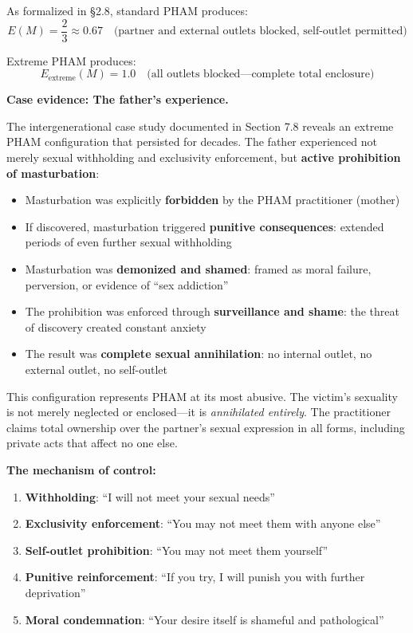 \documentclass[12pt, letterpaper]{article}
\begin{document}
As formalized in \S 2.8, standard PHAM produces:
\[
E(M) = \frac{2}{3} \approx 0.67 \quad \text{(partner and external outlets blocked, self-outlet permitted)}
\]

Extreme PHAM produces:
\[
E_{\text{extreme}}(M) = 1.0 \quad \text{(all outlets blocked---complete total enclosure)}
\]

\textbf{Case evidence: The father's experience.}

The intergenerational case study documented in Section 7.8 reveals an extreme PHAM configuration that persisted for decades. The father experienced not merely sexual withholding and exclusivity enforcement, but \textbf{active prohibition of masturbation}:

\begin{itemize}
    \item Masturbation was explicitly \textbf{forbidden} by the PHAM practitioner (mother)
    \item If discovered, masturbation triggered \textbf{punitive consequences}: extended periods of even further sexual withholding
    \item Masturbation was \textbf{demonized and shamed}: framed as moral failure, perversion, or evidence of ``sex addiction''
    \item The prohibition was enforced through \textbf{surveillance and shame}: the threat of discovery created constant anxiety
    \item The result was \textbf{complete sexual annihilation}: no internal outlet, no external outlet, no self-outlet
\end{itemize}

This configuration represents PHAM at its most abusive. The victim's sexuality is not merely neglected or enclosed---it is \textit{annihilated entirely}. The practitioner claims total ownership over the partner's sexual expression in all forms, including private acts that affect no one else.

\textbf{The mechanism of control:}

\begin{enumerate}
    \item \textbf{Withholding}: ``I will not meet your sexual needs''
    \item \textbf{Exclusivity enforcement}: ``You may not meet them with anyone else''
    \item \textbf{Self-outlet prohibition}: ``You may not meet them yourself''
    \item \textbf{Punitive reinforcement}: ``If you try, I will punish you with further deprivation''
    \item \textbf{Moral condemnation}: ``Your desire itself is shameful and pathological''
\end{enumerate}
\end{document}
